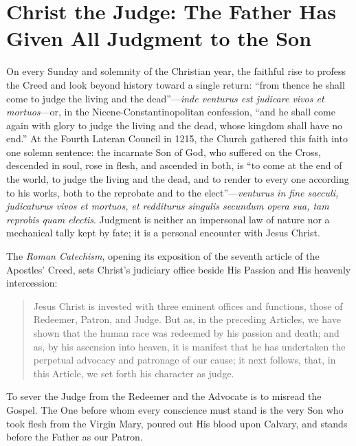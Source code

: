 \section{Christ the Judge: The Father Has Given All Judgment to the Son}

On every Sunday and solemnity of the Christian year, the faithful rise to profess the Creed and look beyond history toward a single return: ``from thence he shall come to judge the living and the dead''---\textit{inde venturus est judicare vivos et mortuos}---or, in the Nicene-Constantinopolitan confession, ``and he shall come again with glory to judge the living and the dead, whose kingdom shall have no end.'' At the Fourth Lateran Council in 1215, the Church gathered this faith into one solemn sentence: the incarnate Son of God, who suffered on the Cross, descended in soul, rose in flesh, and ascended in both, is ``to come at the end of the world, to judge the living and the dead, and to render to every one according to his works, both to the reprobate and to the elect''---\textit{venturus in fine saeculi, judicaturus vivos et mortuos, et redditurus singulis secundum opera sua, tam reprobis quam electis}. Judgment is neither an impersonal law of nature nor a mechanical tally kept by fate; it is a personal encounter with Jesus Christ.

The \textit{Roman Catechism}, opening its exposition of the seventh article of the Apostles' Creed, sets Christ's judiciary office beside His Passion and His heavenly intercession:

\begin{quote}
Jesus Christ is invested with three eminent offices and functions, those of Redeemer, Patron, and Judge. But as, in the preceding Articles, we have shown that the human race was redeemed by his passion and death; and as, by his ascension into heaven, it is manifest that he has undertaken the perpetual advocacy and patronage of our cause; it next follows, that, in this Article, we set forth his character as judge.
\end{quote}

To sever the Judge from the Redeemer and the Advocate is to misread the Gospel. The One before whom every conscience must stand is the very Son who took flesh from the Virgin Mary, poured out His blood upon Calvary, and stands before the Father as our Patron.

